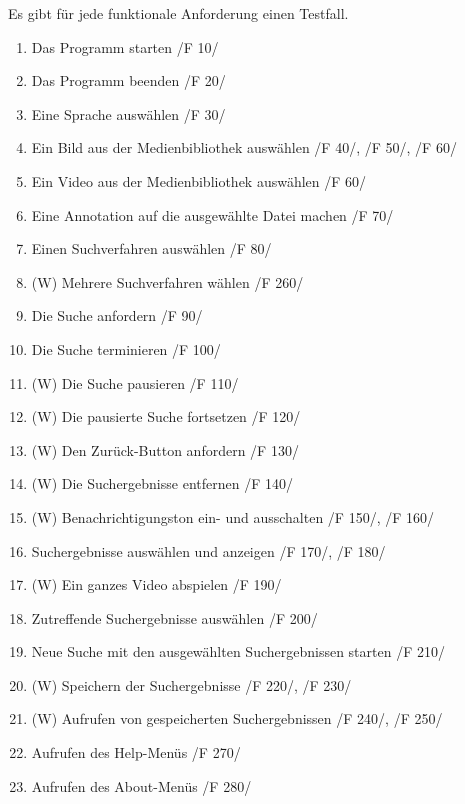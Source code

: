 	Es gibt für jede funktionale Anforderung einen Testfall.
\begin{enumerate} [label=\bfseries /TF \arabic*0/]
	\item Das Programm starten /F 10/
	\item Das Programm beenden /F 20/
	\item Eine Sprache auswählen /F 30/
	\item Ein Bild aus der Medienbibliothek auswählen /F 40/, /F 50/, /F 60/
	\item Ein Video aus der Medienbibliothek auswählen /F 60/
	\item Eine Annotation auf die ausgewählte Datei machen /F 70/
	\item Einen Suchverfahren auswählen /F 80/
	\item (W) Mehrere Suchverfahren wählen /F 260/
	\item Die Suche anfordern /F 90/
	\item Die Suche terminieren /F 100/
	\item (W) Die Suche pausieren /F 110/
	\item (W) Die pausierte Suche fortsetzen /F 120/
	\item (W) Den Zurück-Button anfordern /F 130/
	\item (W) Die Suchergebnisse entfernen /F 140/
	\item (W) Benachrichtigungston ein- und ausschalten /F 150/, /F 160/
	\item Suchergebnisse auswählen und anzeigen /F 170/, /F 180/
	\item (W) Ein ganzes Video abspielen /F 190/
	\item Zutreffende Suchergebnisse auswählen /F 200/
	\item Neue Suche mit den ausgewählten Suchergebnissen starten /F 210/
	\item (W) Speichern der Suchergebnisse /F 220/, /F 230/
	\item (W) Aufrufen von gespeicherten Suchergebnissen /F 240/, /F 250/
	\item Aufrufen des Help-Menüs /F 270/
	\item Aufrufen des About-Menüs /F 280/
\end{enumerate}